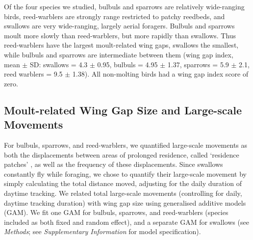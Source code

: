 Of the four species we studied, bulbuls and sparrows are relatively wide-ranging birds, reed-warblers are strongly range restricted to patchy reedbeds, and swallows are very wide-ranging, largely aerial foragers.
Bulbuls and sparrows moult more slowly than reed-warblers, but more rapidly than swallows.
Thus reed-warblers have the largest moult-related wing gaps, swallows the smallest, while bulbuls and sparrows are intermediate between them {(wing gap index, mean $\pm$ SD: swallows = 4.3 $\pm$ 0.95, bulbuls = 4.95 $\pm$ 1.37, sparrows = 5.9 $\pm$ 2.1, reed warblers = 9.5 $\pm$ 1.38)}.
All non-molting birds had a wing gap index score of zero.

\subsection*{Moult-related Wing Gap Size and Large-scale Movements}

For bulbuls, sparrows, and reed-warblers, we quantified large-scale movements as both the displacements between areas of prolonged residence, called `residence patches' \cite{gupte2022d}, as well as the frequency of these displacements.
Since swallows constantly fly while foraging, we chose to quantify their large-scale movement by simply calculating the total distance moved, adjusting for the daily duration of daytime tracking.
We related total large-scale movements (controlling for daily, daytime tracking duration) with wing gap size using generalised additive models (GAM).
We fit one GAM for bulbuls, sparrows, and reed-warblers (species included as both fixed and random effect), and a separate GAM for swallows (see \textit{Methods}; see \textit{Supplementary Information} for model specification).

